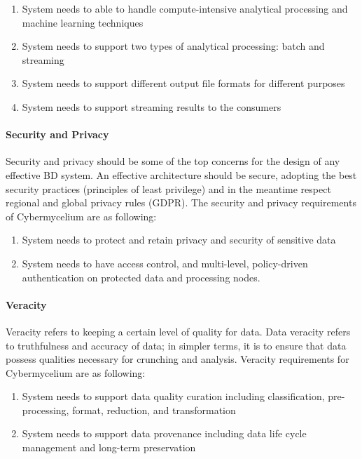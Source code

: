 \documentclass{bmcart}
\begin{document}
\begin{enumerate}[label=\textbf{Val-\arabic*}]
    \item System needs to able to handle compute-intensive analytical processing and machine learning techniques
    \item System needs to support two types of analytical processing: batch and streaming
    \item System needs to support different output file formats for different purposes
    \item System needs to support streaming results to the consumers 
\end{enumerate}

\paragraph{Security and Privacy}

Security and privacy should be some of the top concerns for the design of any effective BD system. An effective architecture should be secure, adopting the best security practices (principles of least privilege) and in the meantime respect regional and global privacy rules (GDPR). The security and privacy requirements of Cybermycelium are as following:

\begin{enumerate}[label=\textbf{SaP-\arabic*}]
    \item System needs to protect and retain privacy and security of sensitive data
    \item System needs to have access control, and multi-level, policy-driven authentication on protected data and processing nodes.
\end{enumerate}

\paragraph{Veracity}

Veracity refers to keeping a certain level of quality for data. Data veracity refers to truthfulness and accuracy of data; in simpler terms, it is to ensure that data possess qualities necessary for crunching and analysis. Veracity requirements for Cybermycelium are as following: 

\begin{enumerate}[label=\textbf{Ver-\arabic*}]
    \item System needs to support data quality curation including classification, pre-processing, format, reduction, and transformation
    \item System needs to support data provenance including data life cycle management and long-term preservation
\end{enumerate}
\end{document}
